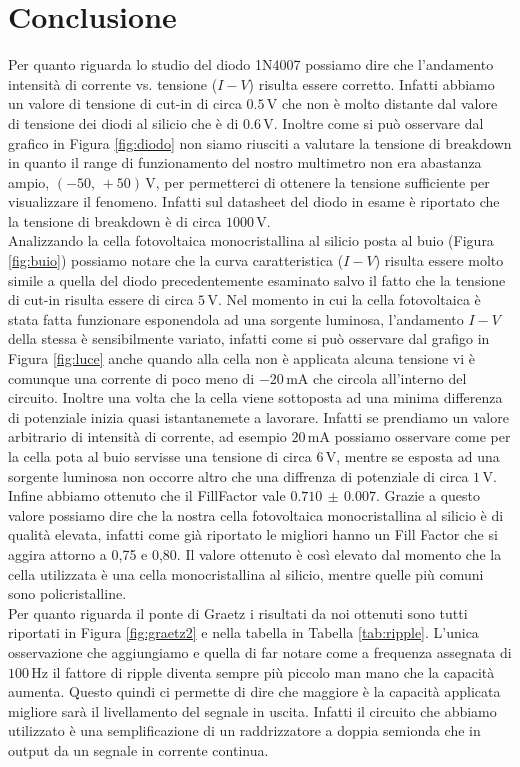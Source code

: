 \section*{Conclusione}

Per quanto riguarda lo studio del diodo 1N4007 possiamo dire che l'andamento intensità di corrente vs. tensione ($I-V$) risulta essere corretto. Infatti abbiamo un valore di tensione di cut-in di circa $0.5\,\si{\volt}$ che non è molto distante dal valore di tensione dei diodi al silicio che è di $0.6\,\si{\volt}$.
Inoltre come si può osservare dal grafico in Figura \ref{fig:diodo} non siamo riusciti a valutare la tensione di breakdown in quanto il range di funzionamento del nostro multimetro non era abastanza ampio, $(-50,\,+50)\,\si{\volt}$, per permetterci di ottenere la tensione sufficiente per visualizzare il fenomeno. Infatti sul datasheet del diodo in esame è riportato che la tensione di breakdown è di circa $1000\,\si{\volt}$.\\

Analizzando la cella fotovoltaica monocristallina al silicio posta al buio (Figura \ref{fig:buio}) possiamo notare che la curva caratteristica ($I-V$) risulta essere molto simile a quella del diodo precedentemente esaminato salvo il fatto che la tensione di cut-in risulta essere di circa $5\,\si{\volt}$.
Nel momento in cui la cella fotovoltaica è stata fatta funzionare esponendola ad una sorgente luminosa, l'andamento $I-V$ della stessa è sensibilmente variato, infatti come si può osservare dal grafigo in Figura \ref{fig:luce} anche quando alla cella non è applicata alcuna tensione vi è comunque una corrente di poco meno di $-20\,\si{\milli\ampere}$ che circola all'interno del circuito.
Inoltre una volta che la cella viene sottoposta ad una minima differenza di potenziale inizia quasi istantanemete a lavorare. Infatti se prendiamo un valore arbitrario di intensità di corrente, ad esempio $20\,\si{\milli\ampere}$ possiamo osservare come per la cella pota al buio servisse una tensione di circa $6\,\si{\volt}$, mentre se esposta ad una sorgente luminosa non occorre altro che una diffrenza di potenziale di circa $1\,\si{\volt}$.
Infine abbiamo ottenuto che il FillFactor vale $0.710\,\pm\,0.007$. Grazie a questo valore possiamo dire che la nostra cella fotovoltaica monocristallina al silicio è di qualità elevata, infatti come già riportato le migliori hanno un Fill Factor che si aggira attorno a 0,75 e 0,80. Il valore ottenuto è così elevato dal momento che la cella utilizzata è una cella monocristallina al silicio, mentre quelle più comuni sono policristalline.\\

Per quanto riguarda il ponte di Graetz i risultati da noi ottenuti sono tutti riportati in Figura \ref{fig:graetz2} e nella tabella in Tabella \ref{tab:ripple}. L'unica osservazione che aggiungiamo e quella di far notare come a frequenza assegnata di $100\,\si{\hertz}$ il fattore di ripple diventa sempre più piccolo man mano che la capacità aumenta. Questo quindi ci permette di dire che maggiore è la capacità applicata migliore sarà il livellamento del segnale in uscita. Infatti il circuito che abbiamo utilizzato è una semplificazione di un raddrizzatore a doppia semionda che in output da un segnale in corrente continua.
